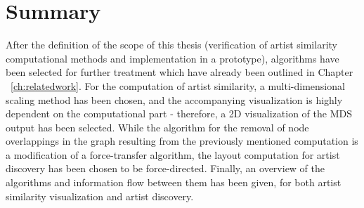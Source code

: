 \section{Summary}

After the definition of the scope of this thesis (verification of artist similarity computational methods and implementation in a prototype), algorithms have been selected for further treatment which have already been outlined in Chapter ~\ref{ch:relatedwork}. For the computation of artist similarity, a multi-dimensional scaling method has been chosen, and the accompanying visualization is highly dependent on the computational part - therefore, a 2D visualization of the MDS output has been selected. 
While the algorithm for the removal of node overlappings in the graph resulting from the previously mentioned computation is a modification of a force-transfer algorithm, the layout computation for artist discovery has been chosen to be force-directed. Finally, an overview of the algorithms and information flow between them has been given, for both artist similarity visualization and artist discovery.